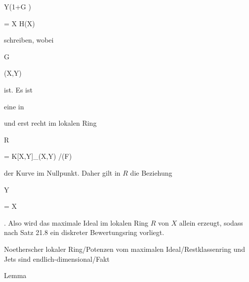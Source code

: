 {{{ Y(1+G )
}

{ =} { X H(X)
}

{ } {
}

{ } {
}

{ } {
}

}
{}{}{}
schreiben, wobei


\mavergleichskette

{\vergleichskette

{G
}

{ \in }{ (X,Y)
}

{  }{
}

{    }{
}

{   }{
}

}
{}{}{}
ist. Es ist

 eine
in

 und erst recht im lokalen Ring


\mavergleichskette

{\vergleichskette

{R
}

{ = }{ K[X,Y]_{(X,Y)} /(F)
}

{  }{
}

{    }{
}

{   }{
}

}
{}{}{}
der Kurve im Nullpunkt. Daher gilt in $R$ die Beziehung


\mavergleichskettedisp

{\vergleichskette

{ Y
}

{ =} { {  } X
}

{ } {
}

{ } {
}

{ } {
}

}
{}{}{.}
Also wird das maximale Ideal im lokalen Ring $R$ von $X$ allein erzeugt, sodass nach
Satz 21.8
ein diskreter Bewertungsring vorliegt.


}





{Noetherscher lokaler Ring/Potenzen vom maximalen Ideal/Restklassenring und Jets sind endlich-dimensional/Fakt}

{Lemma}

{}

